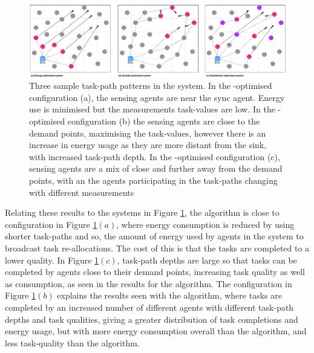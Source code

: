 \begin{figure}
	\centering
	\includegraphics[width=1.0\linewidth]{result-types}
	\caption{Three sample task-path patterns in the \simulationExtended{}{} system. In the \algorithmEnergy{}{}-optimised configuration (a), the sensing agents are near the sync agent. Energy use is minimised but the measurements task-values are low. In the \algorithmQuality{}{}-optimised configuration (b) the sensing agents are close to the demand points, maximising the task-values, however there is an increase in energy usage as they are more distant from the sink, with increased task-path depth. In the \algorithmDistribution{}{}-optimised configuration (c), sensing agents are a mix of close and further away from the demand points, with an the agents participating in the task-paths changing with different measurements}
	\label{fig:result-types}
\end{figure} 

Relating these results to the systems in Figure \ref{fig:result-types}, the \algorithmEnergy{}{} algorithm is close to configuration in Figure \ref{fig:result-types}$(a)$, where energy consumption is reduced by using shorter task-paths and so, the amount of energy used by agents in the system to broadcast task re-allocations. The cost of this is that the tasks are completed to a lower quality. In Figure \ref{fig:result-types}$(c)$, task-path depths are large so that tasks can be completed by agents close to their demand points, increasing task quality as well as consumption, as seen in the results for the \algorithmQuality{}{} algorithm. The configuration in Figure \ref{fig:result-types}$(b)$ explains the results seen with the \algorithmDistribution{}{} algorithm, where tasks are completed by an increased number of different agents with different task-path depths and task qualities, giving a greater distribution of task completions and energy usage, but with more energy consumption overall than the \algorithmEnergy{}{} algorithm, and less task-quality than the \algorithmQuality{}{} algorithm.

